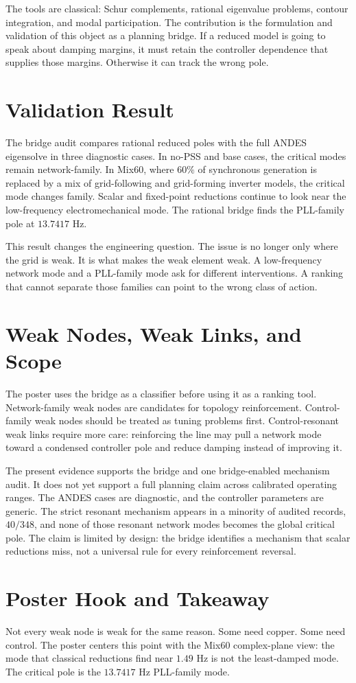 \documentclass[conference]{IEEEtran}
\begin{document}
The tools are classical: Schur complements, rational eigenvalue problems, contour integration, and modal participation. The contribution is the formulation and validation of this object as a planning bridge. If a reduced model is going to speak about damping margins, it must retain the controller dependence that supplies those margins. Otherwise it can track the wrong pole.

\section{Validation Result}

The bridge audit compares rational reduced poles with the full ANDES eigensolve in three diagnostic cases. In no-PSS and base cases, the critical modes remain network-family. In Mix60, where \(60\%\) of synchronous generation is replaced by a mix of grid-following and grid-forming inverter models, the critical mode changes family. Scalar and fixed-point reductions continue to look near the low-frequency electromechanical mode. The rational bridge finds the PLL-family pole at \(13.7417\) Hz.

This result changes the engineering question. The issue is no longer only where the grid is weak. It is what makes the weak element weak. A low-frequency network mode and a PLL-family mode ask for different interventions. A ranking that cannot separate those families can point to the wrong class of action.

\section{Weak Nodes, Weak Links, and Scope}

The poster uses the bridge as a classifier before using it as a ranking tool. Network-family weak nodes are candidates for topology reinforcement. Control-family weak nodes should be treated as tuning problems first. Control-resonant weak links require more care: reinforcing the line may pull a network mode toward a condensed controller pole and reduce damping instead of improving it.

The present evidence supports the bridge and one bridge-enabled mechanism audit. It does not yet support a full planning claim across calibrated operating ranges. The ANDES cases are diagnostic, and the controller parameters are generic. The strict resonant mechanism appears in a minority of audited records, \(40/348\), and none of those resonant network modes becomes the global critical pole. The claim is limited by design: the bridge identifies a mechanism that scalar reductions miss, not a universal rule for every reinforcement reversal.

\section{Poster Hook and Takeaway}

Not every weak node is weak for the same reason. Some need copper. Some need control. The poster centers this point with the Mix60 complex-plane view: the mode that classical reductions find near \(1.49\) Hz is not the least-damped mode. The critical pole is the \(13.7417\) Hz PLL-family mode.
\end{document}
